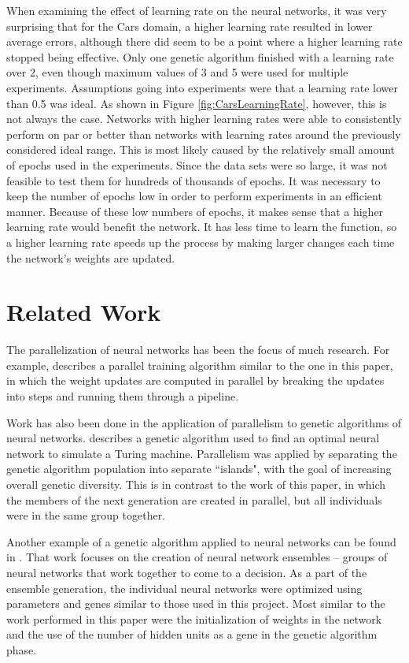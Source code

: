 \documentclass[10pt, conference, compsocconf]{IEEEtran}
\begin{document}
When examining the effect of learning rate on the neural networks, it was very surprising that for the Cars domain, a higher learning rate resulted in lower average errors, although there did seem to be a point where a higher learning rate stopped being effective. Only one genetic algorithm finished with a learning rate over 2, even though maximum values of 3 and 5 were used for multiple experiments. Assumptions going into experiments were that a learning rate lower than 0.5 was ideal. As shown in Figure \ref{fig:CarsLearningRate}, however, this is not always the case. Networks with higher learning rates were able to consistently perform on par or better than networks with learning rates around the previously considered ideal range. This is most likely caused by the relatively small amount of epochs used in the experiments. Since the data sets were so large, it was not feasible to test them for hundreds of thousands of epochs. It was necessary to keep the number of epochs low in order to perform experiments in an efficient manner. Because of these low numbers of epochs, it makes sense that a higher learning rate would benefit the network. It has less time to learn the function, so a higher learning rate speeds up the process by making larger changes each time the network's weights are updated.

\section{Related Work}

The parallelization of neural networks has been the focus of much research. For example, \cite{Kim} describes a parallel training algorithm similar to the one in this paper, in which the weight updates are computed in parallel by breaking the updates into steps and running them through a pipeline.

Work has also been done in the application of parallelism to genetic algorithms of neural networks. \cite{Gruau} describes a genetic algorithm used to find an optimal neural network to simulate a Turing machine. Parallelism was applied by separating the genetic algorithm population into separate ``islands", with the goal of increasing overall genetic diversity. This is in contrast to the work of this paper, in which the members of the next generation are created in parallel, but all individuals were in the same group together.

Another example of a genetic algorithm applied to neural networks can be found in \cite{Soares}. That work focuses on the creation of neural network ensembles -- groups of neural networks that work together to come to a decision. As a part of the ensemble generation, the individual neural networks were optimized using parameters and genes similar to those used in this project. Most similar to the work performed in this paper were the initialization of weights in the network and the use of the number of hidden units as a gene in the genetic algorithm phase.
\end{document}
